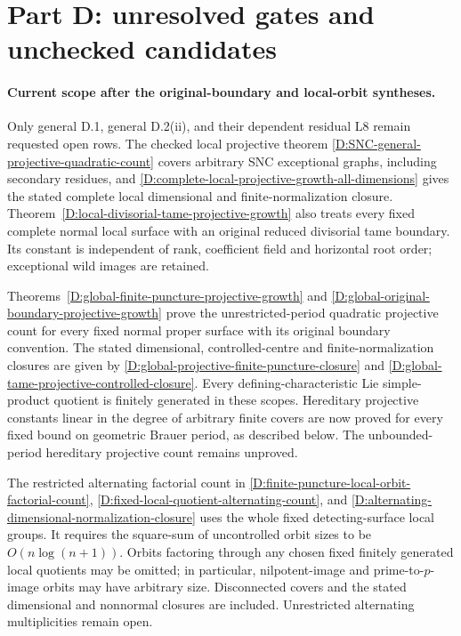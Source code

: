 \section{Part D: unresolved gates and unchecked candidates}

\paragraph{Current scope after the original-boundary and local-orbit syntheses.}
Only general D.1, general D.2(ii), and their dependent residual L8
remain requested open rows. The checked local projective theorem
\ref{D:SNC-general-projective-quadratic-count} covers arbitrary SNC
exceptional graphs, including secondary residues, and
\ref{D:complete-local-projective-growth-all-dimensions} gives the
stated complete local dimensional and finite-normalization closure.
Theorem~\ref{D:local-divisorial-tame-projective-growth} also treats
every fixed complete normal local surface with an original reduced
divisorial tame boundary. Its constant is independent of rank,
coefficient field and horizontal root order; exceptional wild images
are retained.

Theorems~\ref{D:global-finite-puncture-projective-growth} and
\ref{D:global-original-boundary-projective-growth} prove the
unrestricted-period quadratic projective count for every fixed
normal proper surface with its original boundary convention.
The stated dimensional, controlled-centre and finite-normalization
closures are given by
\ref{D:global-projective-finite-puncture-closure} and
\ref{D:global-tame-projective-controlled-closure}.
Every defining-characteristic Lie simple-product quotient is
finitely generated in these scopes. Hereditary projective constants
linear in the degree of arbitrary finite covers are now proved for
every fixed bound on geometric Brauer period, as described below.
The unbounded-period hereditary projective count remains unproved.

The restricted alternating factorial count in
\ref{D:finite-puncture-local-orbit-factorial-count},
\ref{D:fixed-local-quotient-alternating-count}, and
\ref{D:alternating-dimensional-normalization-closure} uses the
whole fixed detecting-surface local groups. It requires the
square-sum of uncontrolled orbit sizes to be $O(n\log(n+1))$.
Orbits factoring through any chosen fixed finitely generated
local quotients may be omitted; in particular, nilpotent-image
and prime-to-$p$-image orbits may have arbitrary size.
Disconnected covers and the stated dimensional and nonnormal
closures are included. Unrestricted alternating multiplicities
remain open.

